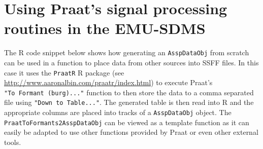\documentclass[]{book}
\theoremstyle{definition}
\theoremstyle{definition}
\theoremstyle{definition}
\theoremstyle{remark}
\begin{document}
\hypertarget{sec:app-chap-wrassp-praatsSigProc}{%
\section{Using Praat's signal processing routines in the
EMU-SDMS}\label{sec:app-chap-wrassp-praatsSigProc}}

The R code snippet below shows how generating an \texttt{AsspDataObj}
from scratch can be used in a function to place data from other sources
into SSFF files. In this case it uses the \texttt{PraatR} R package (see
\url{http://www.aaronalbin.com/praatr/index.html}) to execute Praat's
\texttt{"To\ Formant\ (burg)..."} function to then store the data to a
comma separated file using \texttt{"Down\ to\ Table..."}. The generated
table is then read into R and the appropriate columns are placed into
tracks of a \texttt{AsspDataObj} object. The
\texttt{PraatToFormants2AsspDataObj} can be viewed as a template
function as it can easily be adapted to use other functions provided by
Praat or even other external tools.
\end{document}
